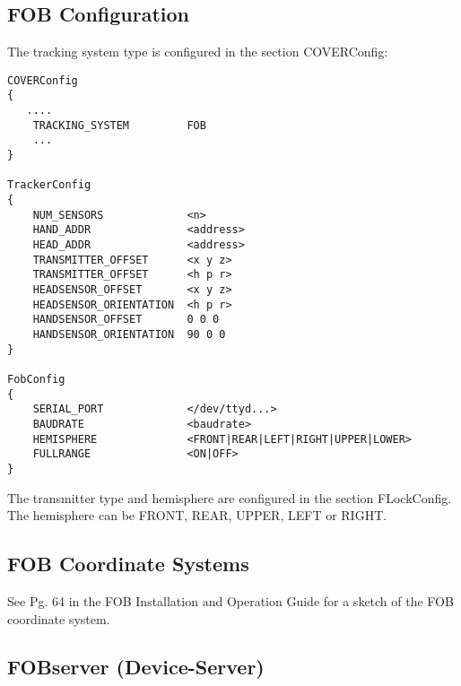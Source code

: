 \subsection{FOB Configuration}
The tracking system type is configured in the section COVERConfig:

\small \begin{verbatim}
COVERConfig
{
   ....
    TRACKING_SYSTEM         FOB
    ...
}

TrackerConfig
{
    NUM_SENSORS             <n>
    HAND_ADDR               <address>
    HEAD_ADDR               <address>
    TRANSMITTER_OFFSET      <x y z>
    TRANSMITTER_OFFSET      <h p r>
    HEADSENSOR_OFFSET       <x y z>
    HEADSENSOR_ORIENTATION  <h p r>
    HANDSENSOR_OFFSET       0 0 0
    HANDSENSOR_ORIENTATION  90 0 0
}

FobConfig
{
    SERIAL_PORT             </dev/ttyd...>
    BAUDRATE                <baudrate>
    HEMISPHERE              <FRONT|REAR|LEFT|RIGHT|UPPER|LOWER>
    FULLRANGE               <ON|OFF>
}
\end{verbatim} \normalsize

The transmitter type and hemisphere are configured in the section FLockConfig.
The hemisphere can be FRONT, REAR, UPPER, LEFT or RIGHT.


\subsection{FOB Coordinate Systems}

See Pg. 64 in the FOB Installation and Operation Guide for a sketch of the 
FOB coordinate system.
%





\subsection{FOBserver (Device-Server)}



